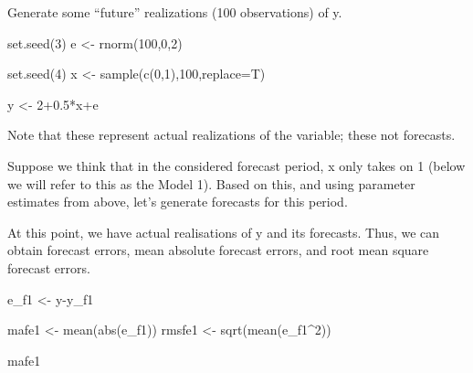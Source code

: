 \documentclass[
  oneside]{book}
\newenvironment{Shaded}{\begin{snugshade}}{\end{snugshade}}
\newcommand{\AttributeTok}[1]{\textcolor[rgb]{0.77,0.63,0.00}{#1}}
\newcommand{\DecValTok}[1]{\textcolor[rgb]{0.00,0.00,0.81}{#1}}
\newcommand{\FloatTok}[1]{\textcolor[rgb]{0.00,0.00,0.81}{#1}}
\newcommand{\FunctionTok}[1]{\textcolor[rgb]{0.00,0.00,0.00}{#1}}
\newcommand{\NormalTok}[1]{#1}
\newcommand{\OtherTok}[1]{\textcolor[rgb]{0.56,0.35,0.01}{#1}}
\newcommand{\SpecialCharTok}[1]{\textcolor[rgb]{0.00,0.00,0.00}{#1}}
\begin{document}
Generate some ``future'' realizations (100 observations) of y.

\begin{Shaded}
\begin{Highlighting}[]
\FunctionTok{set.seed}\NormalTok{(}\DecValTok{3}\NormalTok{)}
\NormalTok{e }\OtherTok{\textless{}{-}} \FunctionTok{rnorm}\NormalTok{(}\DecValTok{100}\NormalTok{,}\DecValTok{0}\NormalTok{,}\DecValTok{2}\NormalTok{)}

\FunctionTok{set.seed}\NormalTok{(}\DecValTok{4}\NormalTok{)}
\NormalTok{x }\OtherTok{\textless{}{-}} \FunctionTok{sample}\NormalTok{(}\FunctionTok{c}\NormalTok{(}\DecValTok{0}\NormalTok{,}\DecValTok{1}\NormalTok{),}\DecValTok{100}\NormalTok{,}\AttributeTok{replace=}\NormalTok{T)}

\NormalTok{y }\OtherTok{\textless{}{-}} \DecValTok{2}\FloatTok{+0.5}\SpecialCharTok{*}\NormalTok{x}\SpecialCharTok{+}\NormalTok{e}
\end{Highlighting}
\end{Shaded}

Note that these represent actual realizations of the variable; these not forecasts.

Suppose we think that in the considered forecast period, x only takes on 1 (below we will refer to this as the Model 1). Based on this, and using parameter estimates from above, let's generate forecasts for this period.

\begin{Shaded}
\end{Shaded}

At this point, we have actual realisations of y and its forecasts. Thus, we can obtain forecast errors, mean absolute forecast errors, and root mean square forecast errors.

\begin{Shaded}
\begin{Highlighting}[]
\NormalTok{e\_f1 }\OtherTok{\textless{}{-}}\NormalTok{ y}\SpecialCharTok{{-}}\NormalTok{y\_f1}

\NormalTok{mafe1 }\OtherTok{\textless{}{-}} \FunctionTok{mean}\NormalTok{(}\FunctionTok{abs}\NormalTok{(e\_f1))}
\NormalTok{rmsfe1 }\OtherTok{\textless{}{-}} \FunctionTok{sqrt}\NormalTok{(}\FunctionTok{mean}\NormalTok{(e\_f1}\SpecialCharTok{\^{}}\DecValTok{2}\NormalTok{))}

\NormalTok{mafe1}
\end{Highlighting}
\end{Shaded}
\end{document}
